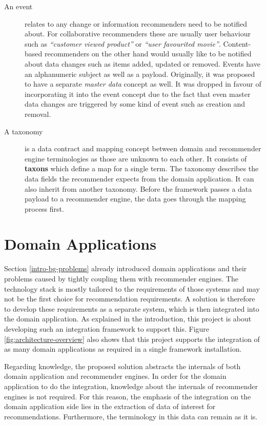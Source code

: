 \begin{description}
\item[\textnormal{An} event] relates to any change or information recommenders need to be notified about. For collaborative recommenders these are usually user behaviour such as \emph{``customer viewed product''} or \emph{``user favourited movie''}. Content-based recommenders on the other hand would usually like to be notified about data changes such as items added, updated or removed. Events have an alphanumeric subject as well as a payload. Originally, it was proposed to have a separate \emph{master data} concept as well. It was dropped in favour of incorporating it into the event concept due to the fact that even master data changes are triggered by some kind of event such as creation and removal.

\item[\textnormal{A} taxonomy] is a data contract and mapping concept between domain and recommender engine terminologies as those are unknown to each other. It consists of \textbf{taxons} which define a map for a single term. The taxonomy describes the data fields the recommender expects from the domain application. It can also inherit from another taxonomy. Before the framework passes a data payload to a recommender engine, the data goes through the mapping process first.

\end{description}

\section{Domain Applications}
\label{architecture-domain-applications}

Section \ref{intro-bg-problems} already introduced domain applications and their problems caused by tightly coupling them with recommender engines. The technology stack is mostly tailored to the requirements of those systems and may not be the first choice for recommendation requirements. A solution is therefore to develop these requirements as a separate system, which is then integrated into the domain application. As explained in the introduction, this project is about developing such an integration framework to support this. Figure \ref{fig:architecture-overview} also shows that this project supports the integration of as many domain applications as required in a single framework installation.

Regarding knowledge, the proposed solution abstracts the internals of both domain application and recommender engines. In order for the domain application to do the integration, knowledge about the internals of recommender engines is not required. For this reason, the emphasis of the integration on the domain application side lies in the extraction of data of interest for recommendations. Furthermore, the terminology in this data can remain as it is.

